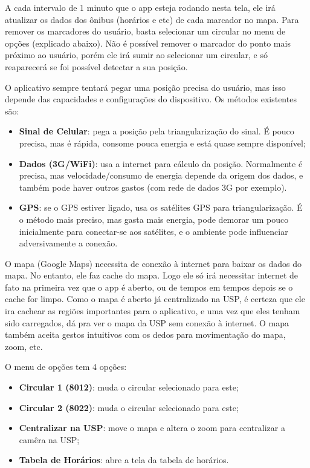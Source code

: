 A cada intervalo de 1 minuto que o app esteja rodando nesta tela, ele irá atualizar os dados dos ônibus (horários e etc)
de cada marcador no mapa.
Para remover os marcadores do usuário, basta selecionar um circular no menu de opções (explicado abaixo). Não é possível
remover o marcador do ponto mais próximo ao usuário, porém ele irá sumir ao selecionar um circular, e só reaparecerá
se foi possível detectar a sua posição.

O aplicativo sempre tentará pegar uma posição precisa do usuário, mas isso depende das capacidades e configurações
do dispositivo. Os métodos existentes são:
\begin{itemize}
    \item \textbf{Sinal de Celular}: pega a posição pela triangularização do sinal. É pouco precisa, mas é rápida,
        consome pouca energia e está quase sempre disponível;
    \item \textbf{Dados (3G/WiFi)}: usa a internet para cálculo da posição. Normalmente é precisa, mas velocidade/consumo
        de energia depende da origem dos dados, e também pode haver outros gastos (com rede de dados 3G por exemplo).
    \item \textbf{GPS}: se o GPS estiver ligado, usa os satélites GPS para triangularização. É o método mais preciso,
        mas gasta mais energia, pode demorar um pouco inicialmente para conectar-se aos satélites, e o ambiente
        pode influenciar adversivamente a conexão.
\end{itemize}

O mapa (Google Maps) necessita de conexão à internet para baixar os dados do mapa. No entanto, ele faz cache 
do mapa. Logo ele só irá necessitar internet de fato na primeira vez que o app é aberto, ou de tempos em tempos
depois se o cache for limpo. Como o mapa é aberto já centralizado na USP, é certeza que ele ira cachear as
regiões importantes para o aplicativo, e uma vez que eles tenham sido carregados, dá pra ver o mapa da USP
sem conexão à internet.
O mapa também aceita gestos intuitivos com os dedos para movimentação do mapa, zoom, etc.

O menu de opções tem 4 opções:
\begin{itemize}
    \item \textbf{Circular 1 (8012)}: muda o circular selecionado para este;
    \item \textbf{Circular 2 (8022)}: muda o circular selecionado para este;
    \item \textbf{Centralizar na USP}: move o mapa e altera o zoom para centralizar a camêra na USP;
    \item \textbf{Tabela de Horários}: abre a tela da tabela de horários.
\end{itemize}

